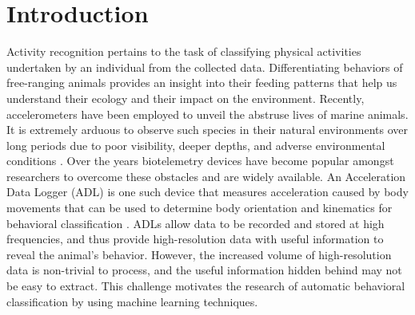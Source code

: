 \documentclass[conference]{IEEEtran}
\begin{document}
\section{Introduction}
Activity recognition pertains to the task of classifying physical activities undertaken by an individual from the collected data. Differentiating behaviors of free-ranging animals provides an insight into their feeding patterns that help us understand their ecology and their impact on the environment. Recently, accelerometers have been employed to unveil the abstruse lives of marine animals.   It is extremely arduous to observe such species in their natural environments over long periods due to poor visibility, deeper depths, and adverse environmental conditions \cite{brew}. Over the years biotelemetry devices have become popular amongst researchers to overcome these obstacles and are widely available. An Acceleration Data Logger (ADL) is one such device that measures acceleration caused by body movements that can be used to determine body orientation and kinematics for behavioral classification \cite{brew}. ADLs allow data to be recorded and stored at high frequencies, and thus provide high-resolution data with useful information to reveal the animal’s behavior. However, the increased   volume of high-resolution data is non-trivial to process, and the useful information hidden behind may not be easy to extract. This challenge motivates the research of automatic behavioral classification by using machine learning techniques.
\end{document}

